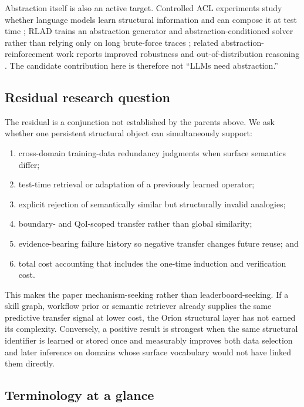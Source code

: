 Abstraction itself is also an active target. Controlled ACL experiments study whether language models learn structural information and can compose it at test time \cite{chen2026structure}; RLAD trains an abstraction generator and abstraction-conditioned solver rather than relying only on long brute-force traces \cite{rlad2026}; related abstraction-reinforcement work reports improved robustness and out-of-distribution reasoning \cite{abstral2026}. The candidate contribution here is therefore not ``LLMs need abstraction.''

\subsection{Residual research question}

The residual is a conjunction not established by the parents above. We ask whether one persistent structural object can simultaneously support:

\begin{enumerate}[leftmargin=*]
\item cross-domain training-data redundancy judgments when surface semantics differ;
\item test-time retrieval or adaptation of a previously learned operator;
\item explicit rejection of semantically similar but structurally invalid analogies;
\item boundary- and QoI-scoped transfer rather than global similarity;
\item evidence-bearing failure history so negative transfer changes future reuse; and
\item total cost accounting that includes the one-time induction and verification cost.
\end{enumerate}

This makes the paper mechanism-seeking rather than leaderboard-seeking. If a skill graph, workflow prior or semantic retriever already supplies the same predictive transfer signal at lower cost, the Orion structural layer has not earned its complexity. Conversely, a positive result is strongest when the same structural identifier is learned or stored once and measurably improves both data selection and later inference on domains whose surface vocabulary would not have linked them directly.

\subsection{Terminology at a glance}

